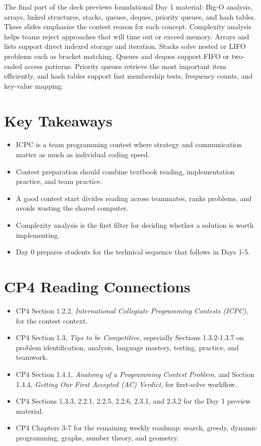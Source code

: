 \documentclass[11pt]{article}
\begin{document}
The final part of the deck previews foundational Day 1 material: Big-O analysis, arrays, linked structures, stacks, queues, deques, priority queues, and hash tables. These slides emphasize the contest reason for each concept. Complexity analysis helps teams reject approaches that will time out or exceed memory. Arrays and lists support direct indexed storage and iteration. Stacks solve nested or LIFO problems such as bracket matching. Queues and deques support FIFO or two-ended access patterns. Priority queues retrieve the most important item efficiently, and hash tables support fast membership tests, frequency counts, and key-value mapping.

\section*{Key Takeaways}
\begin{itemize}
  \item ICPC is a team programming contest where strategy and communication matter as much as individual coding speed.
  \item Contest preparation should combine textbook reading, implementation practice, and team practice.
  \item A good contest start divides reading across teammates, ranks problems, and avoids wasting the shared computer.
  \item Complexity analysis is the first filter for deciding whether a solution is worth implementing.
  \item Day 0 prepares students for the technical sequence that follows in Days 1-5.
\end{itemize}

\section*{CP4 Reading Connections}
\begin{itemize}
  \item CP4 Section 1.2.2, \textit{International Collegiate Programming Contests (ICPC)}, for the contest context.
  \item CP4 Section 1.3, \textit{Tips to be Competitive}, especially Sections 1.3.2-1.3.7 on problem identification, analysis, language mastery, testing, practice, and teamwork.
  \item CP4 Section 1.4.1, \textit{Anatomy of a Programming Contest Problem}, and Section 1.4.4, \textit{Getting Our First Accepted (AC) Verdict}, for first-solve workflow.
  \item CP4 Sections 1.3.3, 2.2.1, 2.2.5, 2.2.6, 2.3.1, and 2.3.2 for the Day 1 preview material.
  \item CP4 Chapters 3-7 for the remaining weekly roadmap: search, greedy, dynamic programming, graphs, number theory, and geometry.
\end{itemize}
\end{document}
